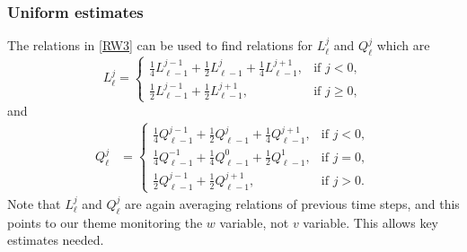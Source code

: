 \documentclass[11pt]{amsart}
\def\l{{h}}
\begin{document}
\subsubsection{Uniform estimates}
The relations in \eqref{RW3} can be used to find relations for $L^j_\ell$ and $Q^j_\ell$ which are
\begin{equation} \label{eq:L}
L^j_\ell = \left\{\begin{array}{ll}
        \frac{1}{4}L_{\ell-1}^{j-1} + \frac{1}{2}L_{\ell-1}^j +
        \frac{1}{4}L_{\ell-1}^{j+1}, & \text{if $j<0$},\\
        \frac{1}{2}L_{\ell-1}^{j-1} + \frac{1}{2}L_{\ell-1}^{j+1}, &
        \text{if $j\ge0$},
        \end{array}\right.
\end{equation}
and
\begin{equation}\label{eq:Q}
\begin{aligned}
Q^j_\ell %
&=\left\{\begin{array}{ll}
        \frac{1}{4}Q_{\ell-1}^{j-1} + \frac{1}{2}Q_{\ell-1}^{j} +
        \frac{1}{4}Q_{\ell-1}^{j+1}, & \text{if $j<0$},\\
        \frac{1}{4}Q_{\ell-1}^{-1} + \frac{1}{4}Q_{\ell-1}^{0} +
        \frac{1}{2}Q_{\ell-1}^{1}, & \text{if $j=0$},\\
        \frac{1}{2}Q_{\ell-1}^{j-1} + \frac{1}{2}Q_{\ell-1}^{j+1}, &
        \text{if $j>0$}.
        \end{array}\right.
 \end{aligned}
\end{equation}
Note that $L^j_\ell$ and $Q^j_\ell$ are again averaging relations of previous time steps, and this points to our theme monitoring the $w$ variable, not $v$ variable. This allows key estimates needed.
\end{document}
